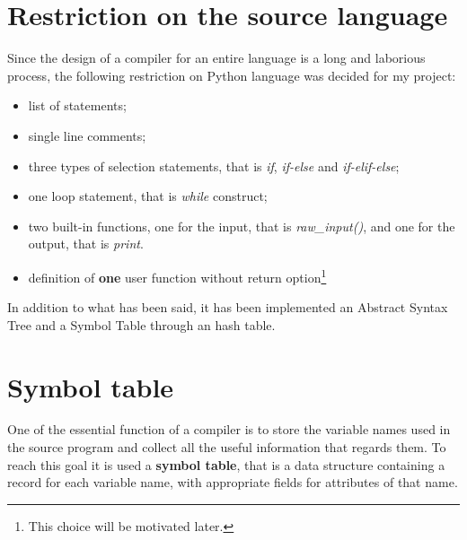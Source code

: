 \documentclass[a4paper,12pt,,titlepage,openright]{report}
\begin{document}
\section{Restriction on the source language}
Since the design of a compiler for an entire language is a long and laborious process, the following restriction on Python language was decided for my project:
\begin{itemize}
\item list of statements;
\item single line comments;
\item three types of selection statements, that is \textit{if}, \textit{if-else} and \textit{if-elif-else};
\item one loop statement, that is \textit{while} construct;
\item two built-in functions, one for the input, that is \textit{raw\_input()}, and one for the output, that is \textit{print}.
\item definition of \textbf{one} user function without return option\footnote{This choice will be motivated later.}
\end{itemize}
In addition to what has been said, it has been implemented an Abstract Syntax Tree and a Symbol Table through an hash table.

\section{Symbol table}
One of the essential function of a compiler is to store the variable names used in the source program and collect all the useful information that regards them. To reach this goal it is used a \textbf{symbol table}, that is a data structure containing a record for each variable name, with appropriate fields for attributes of that name.
\end{document}
